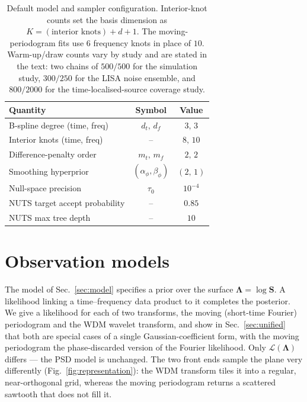 \documentclass[
  aps,
  prd,
  twocolumn,
  amsmath,
  amssymb,
  nofootinbib,
  superscriptaddress,
  longbibliography,
]{revtex4-2}
\begin{document}
\begin{table}[t]
\caption{Default model and sampler configuration. Interior-knot counts set the
basis dimension as $K = (\text{interior knots}) + d + 1$. The
moving-periodogram fits use $6$ frequency knots in place of $10$. Warm-up/draw
counts vary by study and are stated in the text: two chains of $500/500$ for
the simulation study, $300/250$ for the LISA noise ensemble, and $800/2000$ for
the time-localised-source coverage study.}
\label{tab:config}
\begin{ruledtabular}
\begin{tabular}{lcc}
Quantity & Symbol & Value \\
\hline
B-spline degree (time, freq)      & $d_t,\,d_f$ & $3,\,3$ \\
Interior knots (time, freq)       & --          & $8,\,10$ \\
Difference-penalty order          & $m_t,\,m_f$ & $2,\,2$ \\
Smoothing hyperprior              & $(\alpha_\phi,\beta_\phi)$ & $(2,\,1)$ \\
Null-space precision              & $\tau_0$    & $10^{-4}$ \\
NUTS target accept probability    & --          & $0.85$ \\
NUTS max tree depth               & --          & $10$ \\
\end{tabular}
\end{ruledtabular}
\end{table}

\section{Observation models}
\label{sec:obs}

The model of Sec.~\ref{sec:model} specifies a prior over the surface
$\bm{\Lambda} = \log\mathbf{S}$. A likelihood linking a time--frequency data
product to it completes the posterior. We give a likelihood for each of two
transforms, the moving (short-time Fourier) periodogram and the WDM wavelet
transform, and show in Sec.~\ref{sec:unified} that both are special cases of a
single Gaussian-coefficient form, with the moving periodogram the phase-discarded
version of the Fourier likelihood. Only $\mathcal{L}(\bm{\Lambda})$ differs --- the
PSD model is unchanged. The two front ends sample the plane very differently
(Fig.~\ref{fig:representation}): the WDM transform tiles it into a regular,
near-orthogonal grid, whereas the moving periodogram returns a scattered sawtooth
that does not fill it.
\end{document}
